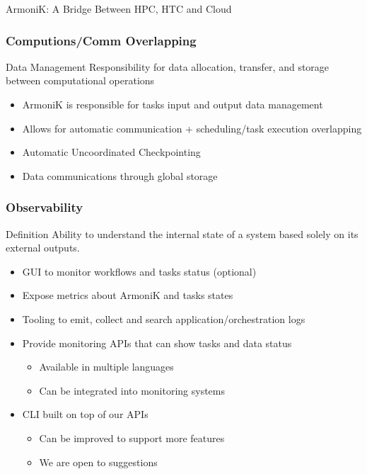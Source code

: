 \documentclass[10pt,aspectratio=1609]{beamer}
\begin{document}
\begin{section}{ArmoniK: A Bridge Between HPC, HTC and Cloud}
  \begin{frame}
    \frametitle{Computions/Comm Overlapping}
    \begin{block}{Data Management}
      Responsibility for data allocation, transfer, and storage between computational operations
    \end{block}
    \begin{itemize}
      \item ArmoniK is responsible for tasks input and output data management
      \item Allows for automatic communication + scheduling/task execution overlapping
      \item Automatic Uncoordinated Checkpointing
      \item Data communications through global storage
    \end{itemize}
  \end{frame}

  \begin{frame}
    \frametitle{Observability}
    \begin{block}{Definition}
      Ability to understand the internal state of a system based solely on its external outputs.
    \end{block}
    \begin{itemize}
      \item GUI to monitor workflows and tasks status (optional)
      \item Expose metrics about ArmoniK and tasks states
      \item Tooling to emit, collect and search application/orchestration logs
      \item Provide monitoring APIs that can show tasks and data status
      \begin{itemize}
        \item Available in multiple languages
        \item Can be integrated into monitoring systems
      \end{itemize}
      \item CLI built on top of our APIs
      \begin{itemize}
        \item Can be improved to support more features
        \item We are open to suggestions
      \end{itemize}
    \end{itemize}
  \end{frame}


\end{section}
\end{document}
